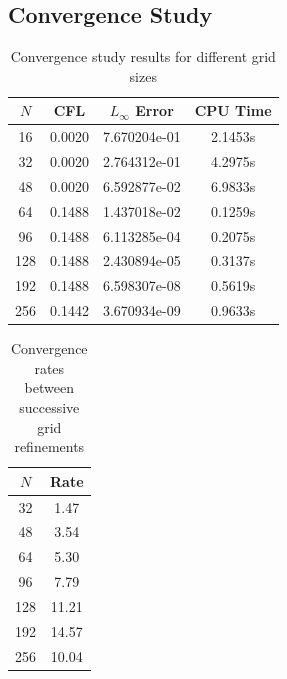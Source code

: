\subsection{Convergence Study}

\begin{table}[H]
	\centering
	\begin{tabular}{|c|c|c|c|}
		\hline
		$N$ & CFL    & $L_\infty$ Error & CPU Time \\
		\hline
		16  & 0.0020 & 7.670204e-01     & 2.1453s  \\
		32  & 0.0020 & 2.764312e-01     & 4.2975s  \\
		48  & 0.0020 & 6.592877e-02     & 6.9833s  \\
		64  & 0.1488 & 1.437018e-02     & 0.1259s  \\
		96  & 0.1488 & 6.113285e-04     & 0.2075s  \\
		128 & 0.1488 & 2.430894e-05     & 0.3137s  \\
		192 & 0.1488 & 6.598307e-08     & 0.5619s  \\
		256 & 0.1442 & 3.670934e-09     & 0.9633s  \\
		\hline
	\end{tabular}
	\caption{Convergence study results for different grid sizes}
	\label{tab:convergence}
\end{table}

\begin{table}[H]
	\centering
	\begin{tabular}{|c|c|}
		\hline
		$N$ & Rate  \\
		\hline
		32  & 1.47  \\
		48  & 3.54  \\
		64  & 5.30  \\
		96  & 7.79  \\
		128 & 11.21 \\
		192 & 14.57 \\
		256 & 10.04 \\
		\hline
	\end{tabular}
	\caption{Convergence rates between successive grid refinements}
	\label{tab:rates}
\end{table}

